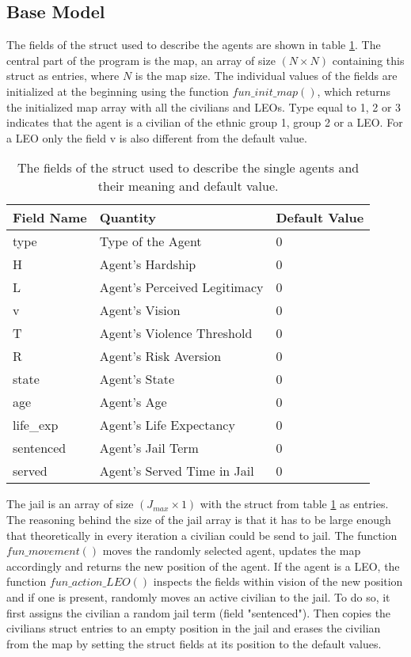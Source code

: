 \documentclass[11pt]{article}
\begin{document}
\subsection{Base Model}
The fields of the struct used to describe the agents are shown in table \ref{tab:fields_struct}. The central part of the program is the map, an array of size $(N \times N)$ containing this struct as entries, where $N$ is the map size. The individual values of the fields are initialized at the beginning using the function $fun\_init\_map()$, which returns the initialized map array with all the civilians and LEOs. Type equal to 1, 2 or 3 indicates that the agent is a civilian of the ethnic group 1, group 2 or a LEO. For a LEO only the field v is also different from the default value.
\begin{table}[!htbp]
	\centering
	\caption{The fields of the struct used to describe the single agents and their meaning and default value.}
	\vspace{0.5 cm}
		\begin{tabular}{l | l | l} 
			Field Name & Quantity & Default Value\\
			\hline
			type & Type of the Agent & 0\\
			H & Agent's Hardship & 0\\
			L & Agent's Perceived Legitimacy & 0\\
			v & Agent's Vision & 0\\
			T & Agent's Violence Threshold & 0\\
			R & Agent's Risk Aversion & 0\\
			state & Agent's State & 0\\
			age & Agent's Age & 0\\
			life\_exp & Agent's Life Expectancy & 0\\
			sentenced & Agent's Jail Term & 0\\
			served & Agent's Served Time in Jail & 0
	\end{tabular}
	\label{tab:fields_struct}
\end{table}
The jail is an array of size $(J_{max} \times 1)$ with the struct from table \ref{tab:fields_struct} as entries. The reasoning behind the size of the jail array is that it has to be large enough that theoretically in every iteration a civilian could be send to jail. The function $fun\_movement()$ moves the randomly selected agent, updates the map accordingly and returns the new position of the agent. If the agent is a LEO, the function $fun\_action\_LEO()$ inspects the fields within vision of the new position and if one is present, randomly moves an active civilian to the jail. To do so, it first assigns the civilian a random jail term (field "sentenced"). Then copies the civilians struct entries to an empty position in the jail and erases the civilian from the map by setting the struct fields at its position to the default values.\\
\end{document}
